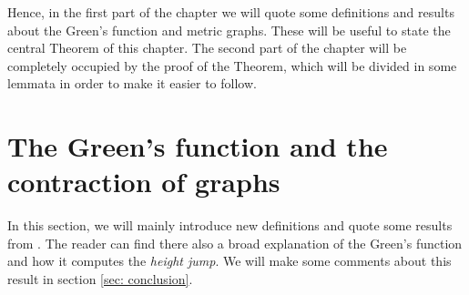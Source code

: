 \documentclass[a4paper,12 pt,titlepage,twoside]{book}
\theoremstyle{plain}
\theoremstyle{theorem}
\theoremstyle{definition}
\theoremstyle{remark}
\begin{document}
	Hence, in the first part of the chapter we will quote some definitions and results about the Green's function and metric graphs. These will be useful to state the central Theorem of this chapter.
	The second part of the chapter will be completely occupied by the proof of the Theorem, which will be divided in some lemmata in order to make it easier to follow.
	\section{The Green's function and the contraction of graphs}
	In this section, we will mainly introduce new definitions and quote some results from \cite{MR3488379}. The reader can find there also a broad explanation of the Green's function and how it computes the \emph{height jump}. We will make some comments about this result in section \ref{sec: conclusion}.
\end{document}
